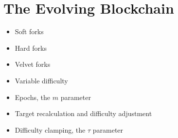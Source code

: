 \chapter{The Evolving Blockchain}

{\color{red}
\begin{itemize}
\item Soft forks
\item Hard forks
\item Velvet forks
\item Variable difficulty
\item Epochs, the $m$ parameter
\item Target recalculation and difficulty adjustment
\item Difficulty clamping, the $\tau$ parameter
\end{itemize}
}
